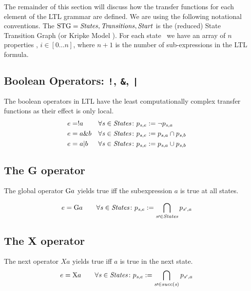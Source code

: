 The remainder of this section will discuss how the transfer functions
for each element of the LTL grammar are defined. We are using the
following notational conventions. The
$\mathrm{STG}={\mathit{States},\mathit{Transitions},\mathit{Start}}$ is the
(reduced) State Transition Graph (or Kripke Model
\citep[pg. 27ff]{Clarke1999}). For each state \state\ we have an array of $n$
properties , $i \in [0\dots n]$, where $n+1$ is the number of
sub-expressions in the LTL formula.

\subsection{Boolean Operators: \texttt{!}, \texttt{\&}, \texttt{|}}
The boolean operators in LTL have the least computationally complex
transfer functions as their effect is only local.
\begin{align*}
e &= !a  & \forall\mathit{s}\in\mathit{States}\colon p_{\mathit{s},e} &:= \neg p_{\mathit{s},a}\\
e &= a \& b & \forall\mathit{s}\in\mathit{States}\colon p_{\mathit{s},e} &:= p_{\mathit{s},a} \cap p_{\mathit{s},b}\\
e &= a | b & \forall\mathit{s}\in\mathit{States}\colon p_{\mathit{s},e} &:= p_{\mathit{s},a} \cup p_{\mathit{s},b}\\
\end{align*}

\subsection{The G operator}
The global operator $\mathrm{G} a$ yields true iff the subexpression $a$ is true at
all states.

\[ e = \mathrm{G} a \qquad \forall\mathit{s}\in\mathit{States}\colon p_{\mathit{s},e} :=\bigcap_{\mathit{s}\prime\in\mathit{States}}{p_{\mathit{s}',a}} \]

\subsection{The X operator}
The next operator $X a$ yields true iff $a$ is true in the next state.
\[ e = \mathrm{X} a \qquad\forall\mathit{s}\in\mathit{States}\colon p_{\mathit{s},e}:=\bigcap_{\mathit{s}\prime\in succ(\mathit{s})}{p_{\mathit{s}',a}} \]

